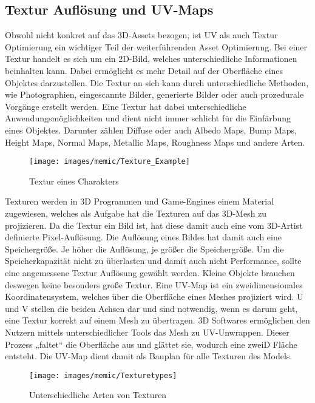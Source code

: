 \subsection{Textur Auflösung und UV-Maps}

Obwohl nicht konkret auf das 3D-Assets bezogen, ist UV als auch Textur Optimierung ein wichtiger Teil der weiterführenden Asset Optimierung. Bei einer Textur handelt es sich um ein 2D-Bild, welches unterschiedliche Informationen beinhalten kann. 
Dabei ermöglicht es mehr Detail auf der Oberfläche eines Objektes darzustellen. Die Textur an sich kann durch unterschiedliche Methoden, wie Photographien, eingescannte Bilder, generierte Bilder oder auch prozedurale Vorgänge erstellt werden. Eine Textur hat dabei unterschiedliche Anwendungsmöglichkeiten und dient nicht immer schlicht für die Einfärbung eines Objektes. Darunter zählen Diffuse oder auch Albedo Maps, Bump Maps, Height Maps, Normal Maps, Metallic Maps, Roughness Maps und andere Arten.\cite[S.18]{_3d_modeling_pipline}

\begin{figure}[H]
	\centering
	\texttt{[image: images/memic/Texture\_Example]}
	\caption{Textur eines Charakters}
\end{figure}
\cite{_textureExample}

Texturen werden in 3D Programmen und Game-Engines einem Material zugewiesen, welches als Aufgabe hat die Texturen auf das 3D-Mesh zu projizieren. Da die Textur ein Bild ist, hat diese damit auch eine vom 3D-Artist definierte Pixel-Auflösung. Die Auflösung eines Bildes hat damit auch eine Speichergröße. Je höher die Auflösung, je größer die Speichergröße. Um die Speicherkapazität nicht zu überlasten und damit auch nicht Performance, sollte eine angemessene Textur Auflösung gewählt werden.\cite[S.141]{_unity_game_optimization} Kleine Objekte brauchen deswegen keine besonders große Textur.
Eine UV-Map ist ein zweidimensionales Koordinatensystem, welches über die Oberfläche eines Meshes projiziert wird. U und V stellen die beiden Achsen dar und sind notwendig, wenn es darum geht, eine Textur korrekt auf einem Mesh zu übertragen.\cite{_the_complete_guide_to_blender} 3D Softwares ermöglichen den Nutzern mittels unterschiedlicher Tools das Mesh zu UV-Unwrappen. Dieser Prozess „faltet“ die Oberfläche aus und glättet sie, wodurch eine zweiD Fläche entsteht. Die UV-Map dient damit als Bauplan für alle Texturen des Models.\cite[79]{_3d_game_textures}

\begin{figure}[H]
	\centering
	\texttt{[image: images/memic/Texturetypes]}
	\caption{Unterschiedliche Arten von Texturen}
\end{figure}
\Cite{_textureTypes}

